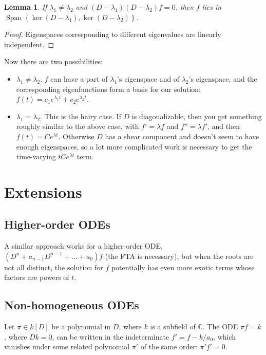 \documentclass[oneside]{memoir}
\newtheorem{lemma}{Lemma}
\begin{document}
	\begin{lemma}
		If \(\lambda_1 \neq \lambda_2\) and \((D - \lambda_1)(D - \lambda_2)f = 0\), then \(f\) lies in \(\operatorname{Span}\left\{\ker (D - \lambda_1), \ker (D - \lambda_2)\right\}\).
	\end{lemma}
	\begin{proof}
		Eigenspaces corresponding to different eigenvalues are linearly independent.
		
	\end{proof}
	
	Now there are two possibilities:
	\begin{itemize}
		\item \(\lambda_1 \neq \lambda_2\). \(f\) can have a part of \(\lambda_1\)'s eigenspace and of \(\lambda_2\)'s eigenspace, and the corresponding eigenfunctions form a basis for our solution: \(f(t) = c_1 e^{\lambda_1t} + c_2 e^{\lambda_2t}\).
	
		\item \(\lambda_1 = \lambda_2\). This is the hairy case. If \(D\) is diagonalizable, then you get something roughly similar to the above case, with \(f' = \lambda f\) and \(f'' = \lambda f'\), and then \(f(t) = Ce^{\lambda t}\). Otherwise \(D\) has a shear component and doesn't seem to have enough eigenspaces, so a lot more complicated work is necessary to get the time-varying \(tCe^{\lambda t}\) term.
	\end{itemize}
	
	\section{Extensions}
	\subsection{Higher-order ODEs}
	A similar approach works for a higher-order ODE, \((D^n + a_{n - 1} D^{n - 1} + \ldots + a_0)f\) (the FTA is necessary), but when the roots are not all distinct, the solution for \(f\) potentially has even more exotic terms whose factors are powers of \(t\).
	
	\subsection{Non-homogeneous ODEs}
	Let \(\pi\in k[D]\) be a polynomial in \(D\), where \(k\) is a subfield of \(\mathbb{C}\). The ODE \(\pi f = k\), where \(Dk = 0\), can be written in the indeterminate \(f' = f - k/a_0\), which vanishes under some related polynomial \(\pi'\) of the same order: \(\pi'f' = 0\).
\end{document}
